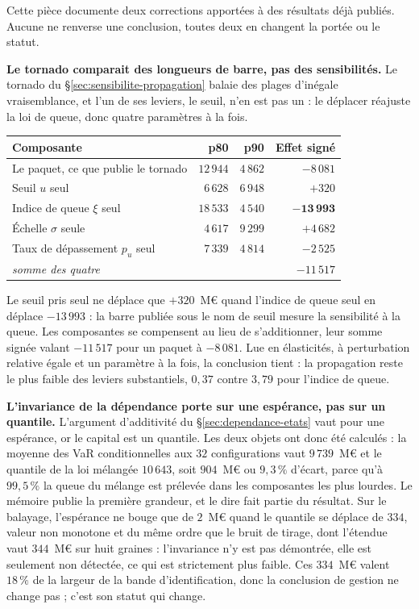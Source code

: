 Cette pièce documente deux corrections apportées à des résultats déjà publiés. Aucune ne renverse
une conclusion, toutes deux en changent la portée ou le statut.

\textbf{Le tornado comparait des longueurs de barre, pas des sensibilités.} Le tornado du
\S\ref{sec:sensibilite-propagation} balaie des plages d'inégale vraisemblance, et l'un de ses
leviers, le seuil, n'en est pas un : le déplacer réajuste la loi de queue, donc quatre paramètres à
la fois.

\begin{center}\footnotesize
\renewcommand{\arraystretch}{1.2}
\begin{tabular}{@{}l r r r@{}}
\toprule
\textbf{Composante} & \textbf{p80} & \textbf{p90} & \textbf{Effet signé} \\
\midrule
Le paquet, ce que publie le tornado & $12\,944$ & $4\,862$ & $-8\,081$ \\
\midrule
Seuil $u$ seul & $6\,628$ & $6\,948$ & $+320$ \\
Indice de queue $\xi$ seul & $18\,533$ & $4\,540$ & $\mathbf{-13\,993}$ \\
Échelle $\sigma$ seule & $4\,617$ & $9\,299$ & $+4\,682$ \\
Taux de dépassement $p_u$ seul & $7\,339$ & $4\,814$ & $-2\,525$ \\
\midrule
\emph{somme des quatre} & & & $-11\,517$ \\
\bottomrule
\end{tabular}
\end{center}

\vspace{4pt}
\noindent Le seuil pris seul ne déplace que $+320$~M\euro{} quand l'indice de queue seul en
déplace $-13\,993$ : la barre publiée sous le nom de \og seuil \fg{} mesure la sensibilité à la
queue. Les composantes se compensent au lieu de s'additionner, leur somme signée valant
$-11\,517$ pour un paquet à $-8\,081$. Lue en élasticités, à perturbation relative égale et un
paramètre à la fois, la conclusion tient : la propagation reste le plus faible des leviers
substantiels, $0{,}37$ contre $3{,}79$ pour l'indice de queue.

\textbf{L'invariance de la dépendance porte sur une espérance, pas sur un quantile.} L'argument
d'additivité du \S\ref{sec:dependance-etats} vaut pour une espérance, or le capital est un
quantile. Les deux objets ont donc été calculés : la moyenne des VaR conditionnelles aux $32$
configurations vaut $9\,739$~M\euro{} et le quantile de la loi mélangée $10\,643$, soit
$904$~M\euro{} ou $9{,}3\,\%$ d'écart, parce qu'à $99{,}5\,\%$ la queue du mélange est prélevée
dans les composantes les plus lourdes. Le mémoire publie la première grandeur, et le dire fait
partie du résultat. Sur le balayage, l'espérance ne bouge que de $2$~M\euro{} quand le quantile se
déplace de $334$, valeur non monotone et du même ordre que le bruit de tirage, dont l'étendue vaut
$344$~M\euro{} sur huit graines : l'invariance n'y est pas démontrée, elle est seulement non
détectée, ce qui est strictement plus faible. Ces $334$~M\euro{} valent $18\,\%$ de la largeur de
la bande d'identification, donc la conclusion de gestion ne change pas ; c'est son statut qui
change.


